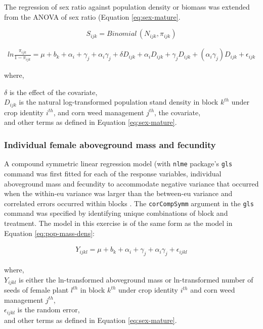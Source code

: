 \documentclass[
]{article}
\begin{document}
The regression of sex ratio against population density or biomass was extended from the ANOVA of sex ratio (Equation \eqref{eq:sex-mature}.

\[ S_{ijk} = Binomial\,(N_{ijk},\pi_{ijk}) \]

\begin{align}
ln \frac{\pi_{ijk}}{1-\pi_{ijk}} = \mu + b_k + \alpha_i + \gamma_j +\alpha_i \gamma_j + \delta D_{ijk}  + \alpha_i D_{ijk} + \gamma_j D_{ijk} + (\alpha_i \gamma_j)D_{ijk} + \epsilon_{ijk} \label{eq:sex-mature-anc}
\end{align}

where,

\(\delta\) is the effect of the covariate,\\
\(D_{ijk}\) is the natural log-transformed population stand density in block \(k^{th}\) under crop identity \(i^{th}\), and corn weed management \(j^{th}\), the covariate,\\
and other terms as defined in Equation \eqref{eq:sex-mature}.

\hypertarget{individual-female-aboveground-mass-and-fecundity-1}{%
\subsubsection*{Individual female aboveground mass and fecundity}\label{individual-female-aboveground-mass-and-fecundity-1}}

A compound symmetric linear regression model (with \texttt{nlme} package's \texttt{gls} command was first fitted for each of the response variables, individual aboveground mass and fecundity to accommodate negative variance that occurred when the within-eu variance was larger than the between-eu variance and correlated errors occurred within blocks \citep[version 3.1-153][]{pinheroNlmeLinearNonlinear2021}.
The \texttt{corCompSymm} argument in the \texttt{gls} command was specified by identifying unique combinations of block and treatment. The model in this exercise is of the same form as the model in Equation \eqref{eq:pop-mass-dens}:

\begin{align}
Y_{ijkl} = \mu + b_k + \alpha_i + \gamma_j +\alpha_i \gamma_j + \epsilon_{ijkl} \label{eq:indiv-mass-fecund}
\end{align}

where,\\
\(Y_{ijkl}\) is either the ln-transformed aboveground mass or ln-transformed number of seeds of female plant \(l^{th}\) in block \(k^{th}\) under crop identity \(i^{th}\) and corn weed management \(j^{th}\),\\
\(\epsilon_{ijkl}\) is the random error,\\
and other terms as defined in Equation \eqref{eq:sex-mature}.
\end{document}
